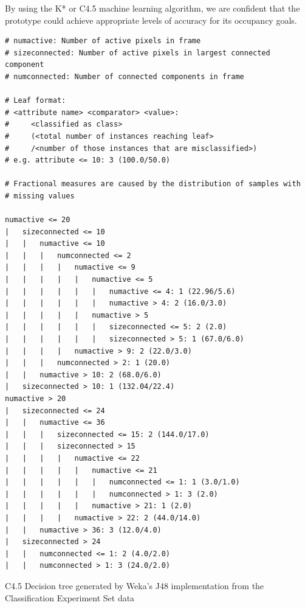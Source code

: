 \documentclass[../thesis/thesis.tex]{subfiles}
\begin{document}
By using the K* or C4.5 machine learning algorithm, we are confident that the prototype could achieve appropriate levels of accuracy for its occupancy goals.

\begin{listing}

\begin{verbatim}
# numactive: Number of active pixels in frame
# sizeconnected: Number of active pixels in largest connected component
# numconnected: Number of connected components in frame

# Leaf format:
# <attribute name> <comparator> <value>:
#     <classified as class>
#     (<total number of instances reaching leaf>
#     /<number of those instances that are misclassified>)
# e.g. attribute <= 10: 3 (100.0/50.0)

# Fractional measures are caused by the distribution of samples with
# missing values

numactive <= 20
|   sizeconnected <= 10
|   |   numactive <= 10
|   |   |   numconnected <= 2
|   |   |   |   numactive <= 9
|   |   |   |   |   numactive <= 5
|   |   |   |   |   |   numactive <= 4: 1 (22.96/5.6)
|   |   |   |   |   |   numactive > 4: 2 (16.0/3.0)
|   |   |   |   |   numactive > 5
|   |   |   |   |   |   sizeconnected <= 5: 2 (2.0)
|   |   |   |   |   |   sizeconnected > 5: 1 (67.0/6.0)
|   |   |   |   numactive > 9: 2 (22.0/3.0)
|   |   |   numconnected > 2: 1 (20.0)
|   |   numactive > 10: 2 (68.0/6.0)
|   sizeconnected > 10: 1 (132.04/22.4)
numactive > 20
|   sizeconnected <= 24
|   |   numactive <= 36
|   |   |   sizeconnected <= 15: 2 (144.0/17.0)
|   |   |   sizeconnected > 15
|   |   |   |   numactive <= 22
|   |   |   |   |   numactive <= 21
|   |   |   |   |   |   numconnected <= 1: 1 (3.0/1.0)
|   |   |   |   |   |   numconnected > 1: 3 (2.0)
|   |   |   |   |   numactive > 21: 1 (2.0)
|   |   |   |   numactive > 22: 2 (44.0/14.0)
|   |   numactive > 36: 3 (12.0/4.0)
|   sizeconnected > 24
|   |   numconnected <= 1: 2 (4.0/2.0)
|   |   numconnected > 1: 3 (24.0/2.0)
\end{verbatim}

\caption{C4.5 Decision tree generated by Weka's J48 implementation from the Classification Experiment Set data}
\label{lst:tree}
\end{listing}
\end{document}
